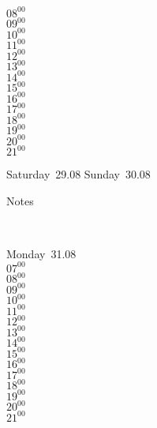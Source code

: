 \documentclass[11pt,a4paper]{book}\usepackage[]{graphicx}\usepackage[]{color}
\begin{document}
{{{{{{{{\begin{tcolorbox}
{$08^{00}$\\
$09^{00}$\\
$10^{00}$\\
$11^{00}$\\
$12^{00}$\\
$13^{00}$\\
$14^{00}$\\
$15^{00}$\\
$16^{00}$\\
$17^{00}$\\
$18^{00}$\\
$19^{00}$\\
$20^{00}$\\
$21^{00}$}\\
\end{tcolorbox} 
%
\begin{tcolorbox}[height=(\textheight-10mm)/6]
Saturday~29.08
\tcblower
Sunday~30.08
\end{tcolorbox} %
%
\begin{tcolorbox}[height=(\textheight-10mm)/6,sidebyside=false]
Notes
\end{tcolorbox}
\clearpage
\vspace{2 mm}\\
%
%
\begin{tcolorbox}
Monday~31.08\\
{ 
$07^{00}$\\
$08^{00}$\\
$09^{00}$\\
$10^{00}$\\
$11^{00}$\\
$12^{00}$\\
$13^{00}$\\
$14^{00}$\\
$15^{00}$\\
$16^{00}$\\
$17^{00}$\\
$18^{00}$\\
$19^{00}$\\
$20^{00}$\\
$21^{00}$}\\
\end{tcolorbox}
%
\begin{tcolorbox}

\end{tcolorbox}}}}}}}}}
\end{document}
